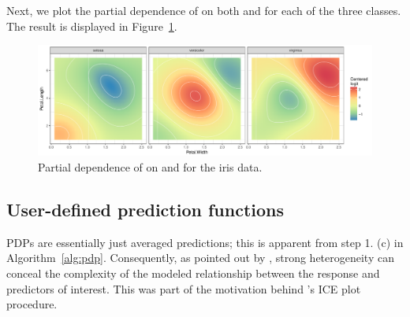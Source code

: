 Next, we plot the partial dependence of  on both  and  for each of the three classes. The result is displayed in Figure~\ref{fig:partial_iris}.

\begin{figure}[!htbp]
  \centering
  \includegraphics[width=1.0\linewidth]{partial_iris_svm}
  \caption{Partial dependence of  on  and  for the iris data.}
  \label{fig:partial_iris}
\end{figure}


\subsection{User-defined prediction functions}
\label{sec:prediction}

PDPs are essentially just averaged predictions; this is apparent from step 1. (c) in Algorithm~\ref{alg:pdp}. Consequently, as pointed out by \citet{goldstein-peeking-2015}, strong heterogeneity can conceal the complexity of the modeled relationship between the response and predictors of interest. This was part of the motivation behind \citeauthor*{goldstein-peeking-2015}'s ICE plot procedure.

